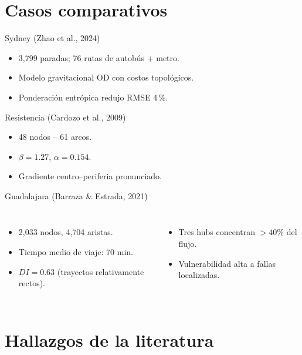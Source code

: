 \documentclass[aspectratio=169,spanish]{beamer}
\begin{document}
\section{Casos comparativos}

\begin{frame}{Sydney (Zhao et al., 2024)}
  \begin{itemize}
    \item 3,799 paradas; 76 rutas de autobús + metro.
    \item Modelo gravitacional OD con costos topológicos.
    \item Ponderación entrópica redujo RMSE 4\,\%.
  \end{itemize}
\end{frame}

\begin{frame}{Resistencia (Cardozo et al., 2009)}
  \begin{itemize}
    \item 48 nodos – 61 arcos.
    \item $\beta = 1.27$, $\alpha = 0.154$.
    \item Gradiente centro–periferia pronunciado.
  \end{itemize}
\end{frame}

\begin{frame}{Guadalajara (Barraza \& Estrada, 2021)}
  \begin{columns}
      \begin{itemize}
        \item 2,033 nodos, 4,704 aristas.
        \item Tiempo medio de viaje: 70 min.
        \item $DI = 0.63$ (trayectos relativamente rectos).
      \end{itemize}
      \begin{itemize}
        \item Tres hubs concentran $>40\%$ del flujo.
        \item Vulnerabilidad alta a fallas localizadas.
      \end{itemize}
  \end{columns}
\end{frame}

\section{Hallazgos de la literatura}
\end{document}
